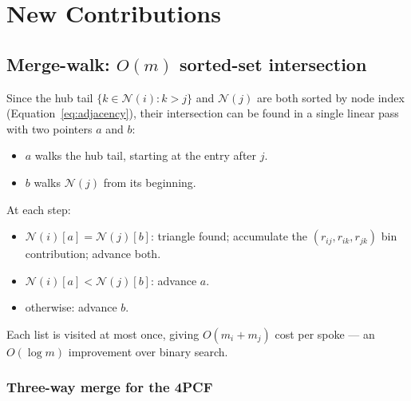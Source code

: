\documentclass[twocolumn]{aastex701}
\begin{document}
\section{New Contributions}
\label{sec:new}

\subsection{Merge-walk: $O(m)$ sorted-set intersection}
\label{sec:mergewalk}

Since the hub tail $\{k \in \mathcal{N}(i) : k > j\}$ and $\mathcal{N}(j)$
are both sorted by node index (Equation~\ref{eq:adjacency}), their
intersection can be found in a single linear pass with two pointers $a$
and $b$:
\begin{itemize}
\item $a$ walks the hub tail, starting at the entry after $j$.
\item $b$ walks $\mathcal{N}(j)$ from its beginning.
\end{itemize}
At each step:
\begin{itemize}
\item $\mathcal{N}(i)[a] = \mathcal{N}(j)[b]$: triangle found; accumulate
  the $(r_{ij}, r_{ik}, r_{jk})$ bin contribution; advance both.
\item $\mathcal{N}(i)[a] < \mathcal{N}(j)[b]$: advance $a$.
\item otherwise: advance $b$.
\end{itemize}
Each list is visited at most once, giving $O(m_i + m_j)$ cost per spoke ---
an $O(\log m)$ improvement over binary search.

\subsubsection{Three-way merge for the 4PCF}
\label{sec:threeway}
\end{document}
